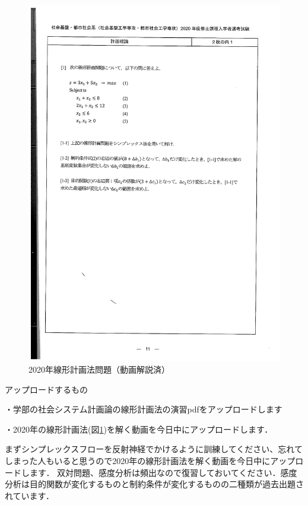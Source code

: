 \documentclass{jsarticle}
\begin{document}
\begin{figure}[htbp]
  \includegraphics[keepaspectratio, width=16cm]{figures/liner2020.png}
  \caption{2020年線形計画法問題（動画解説済）\label{fig:liner2020}}
\end{figure}

アップロードするもの

・学部の社会システム計画論の線形計画法の演習pdfをアップロードします

・2020年の線形計画法(図\ref{fig:liner2020})を解く動画を今日中にアップロードします．

まずシンプレックスフローを反射神経でかけるように訓練してください、忘れてしまった人もいると思うので2020年の線形計画法を解く動画を今日中にアップロードします．
双対問題、感度分析は頻出なので復習しておいてください．感度分析は目的関数が変化するものと制約条件が変化するものの二種類が過去出題されています．
\end{document}
